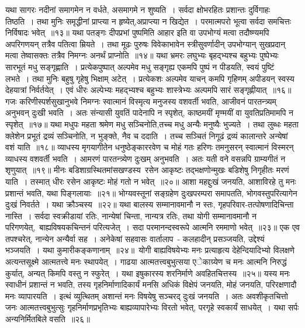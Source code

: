 \indent  यथा सागरः नदीनां समागमेन न वर्धते, असमागमे न शुष्यति~। सर्वदा क्षोभरहितः प्रशान्तः दुर्विगाहः तिष्ठति~। तथा मुनिः समृद्धीनां प्राप्त्या न हृष्येत्,अप्राप्त्या न खिद्येत~। परमात्मपरो भूत्वा सर्वदा समचित्तः निर्विषादः भवेत्~॥१३॥
\indent  यथा पतङ्गः दीपप्रभां पुष्पमिति आहार इति वा उपभोग्यं मत्वा तदौष्ण्यमपि अपरिगणयन् तत्रैव पतित्वा म्रियते~। तथा मूढः पुरुषः विवेकाभावेन स्त्रीसुवर्णादीन् उपभोग्यान् सुखप्रदान् मत्वा तेष्वासक्तः तत्रैव निमग्नः अनर्थं प्राप्नोति~॥१४॥
\indent  यथा भ्रमरः लघुभ्यः बृहद्भ्यश्च बहुभ्यः पुष्पेभ्यः सारभूतं मधु सङ्गृह्णाति~। प्रत्येकपुष्पात् अल्पमेव मधु सङ्गृह्य एकमपि पुष्पं न पीडयति, स्वयं पुष्टिं लभते~। तथा मुनिः बहुषु गृहेषु भिक्षाम् अटेत्~। प्रत्येकशः अल्पमेव  याचन् कमपि गृहिणम् अपीडयन् स्वस्य देहयात्रां निर्वर्तयेत्~। एवं धीरः अल्पेभ्यः महद्भ्यश्च बहुभ्यः शास्त्रेभ्यः अल्पमपि सारं सङ्गृह्णीयात्~॥१६॥
\indent  गजः करिणीस्पर्शसुखानुभवे निमग्नः स्वात्मानं विस्मृत्य मनुजस्य वशवर्ती भवति, आजीवनं पारतन्त्र्यम् अनुभवन् दुःखी भवति~। अतः संन्यासी युवतिं पादेनापि न स्पृशेत्, काष्ठमयीं मृण्मयीं वा युवतिप्रतिमामपि न स्पृशेत्~॥१७॥
\indent  यथा मधुपः महता श्रमेण मधु सञ्चिनोति,तच्च मधु अन्यैः मनुष्यैः भुज्यते~। तथा लुब्धः महता क्लेशेन प्रभूतं द्रव्यं सञ्चिनोति, न भुङ्क्ते, नैव च ददाति~। तच्च सञ्चितं निगूढं द्रव्यं कालान्तरे अन्येषां वशं याति~॥१८॥
\indent  व्याधस्य मृगयागीतेन धनुष्ठेङ्काररवेण च मोहं गतः हरिणः तमनुसरन् स्वात्मानं विस्मरन् व्याधस्य वशवर्ती भवति~। आमरणं पारतन्त्र्येण दुःखम् अनुभवति~। अतः यती वने वसन्नपि ग्राम्यगीतं न शृणुयात्~॥१९॥
\indent  मीनः बडिशाग्रस्थितमांसखण्डस्य\footB\  रसेन आकृष्टः तद्भक्षणोन्मुखः बडिशेषु निगृहीतः मरणं याति~। तस्मात् धीरः रसेन आकृष्टः मोहं गतो न भवेत्~॥२०॥
\indent  आशा महद्दुःखं जनयति, आशाविरहे तु मनः प्रशान्तं भवति, यथा पिङ्गलायाः\footB\ ॥२१॥
\indent  भोग्यवस्तूनां सङ्ग्रहेण  दुःखपरम्परा समापतति, भोगवस्तुपरित्यागेन दुःखं निवर्तते~। यथा क्रौञ्चस्य\footB\ ॥२२॥
\indent  यथा बालस्य सम्मानावमानौ न स्तः, गृहपरिवार-तत्पोषणादिचिन्ता नास्ति~। सर्वदा स्वक्रीडायां रतिः, नान्येषां चिन्ता, नान्यत्र रतिः, तथा योगी सम्मानावमानौ न परिगणयेत्,\footB\ बाह्यविषयकचिन्तनं परित्यजेत्~। सदा परमानन्दस्वरूपे आत्मनि रममाणो भवेत्~॥२३॥
\indent  एक एव  तपश्चरेत्, नान्येन अन्यैर्वा सह~। अनेकेषां सहवासः वार्तालाप~- कलहादीन् प्रसञ्जयति, उद्देश्यं भञ्जयति~। यथा कुमारीकङ्कणानाम्~॥२४॥\footB\ 
\indent  योगी बाह्यविषयेभ्यः मनः प्रत्याहृत्य देहेन्दियादिभ्यो विलक्षणे अत्यन्तसूक्ष्मे आत्मतत्त्वे मनः स्थापयेत्~। गाढया आत्मतत्त्वबुभुत्सया एेकाग्र्येण च मनः आत्मनि निरुद्धं कुर्यात्, अन्यत् किमपि वस्तु न स्फुरेत्~। यथा इषुकारस्य शरनिर्माणे अवहितचित्तस्य\footB\ ॥२५॥
\indent  यस्य मनः स्वाधीनं प्रशान्तं न भवति, तस्य गृहनिर्माणादिकार्यं मनसि अधिकं विक्षेपं जनयति, मोहं जनयति, परिरक्षणादौ मनः व्यापारयति~। इत्थं व्युत्थितम् अशान्तं मनः विषयेषु सञ्चरद्  दुःखं जनयति~। अतः अवशीकृतचित्तो जनः आत्मतत्त्वबुभुत्सुः गृहनिर्माणप्रभृतिभ्यः बाह्यव्यापारेभ्यः विरतो भवेत्, परगृहे स्वकार्यं साधयेत्~। यथा सर्पः अन्यनिर्मितबिले वसति~॥२६॥
